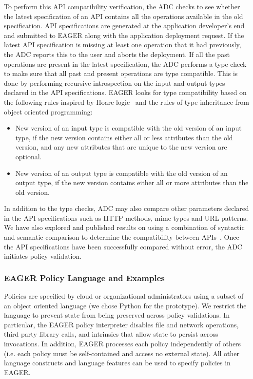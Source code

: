 To perform this API compatibility verification, the ADC checks to see whether
the latest specification of an API contains all the operations available in
the old specification. API specifications are generated at the application developer's
end and submitted to EAGER along with the application deployment request.
If the latest API specification is missing at least one
operation that it had previously, the ADC reports this to the user and aborts
the deployment. If all the past operations are present in the latest
specification, the ADC performs a type check to make sure that all past and
present operations are type compatible. This is done by performing recursive
introspection on the input and output types declared in the API
specifications. EAGER looks for type compatibility based on the following
rules inspired by Hoare logic~\cite{Hoare:1969:ABC:363235.363259} and the
rules of type inheritance from object oriented programming:
\begin{itemize}
\vspace{0.1in}
\item New version of an input type is compatible with the old version of an input type, if the new version contains either all or less attributes than the 
old version, and any new attributes that are unique to the new version are optional.
\vspace{0.1in}
\item New version of an output type is compatible with the old version of an output type, if the new version contains either all or more attributes than the 
old version.
\vspace{0.1in}
\end{itemize}
In addition to the type checks, ADC may also compare other parameters declared in the API specifications
such as HTTP methods, mime types and URL patterns. We have also explored and 
published results on using a combination of syntactic and semantic comparison
to determine the compatibility between APIs~\cite{6930607,jayathilaka2014using}.
Once the API specifications have been successfully compared without error,
the ADC initiates policy validation. 

\subsubsection{EAGER Policy Language and Examples}
\label{sec:policy-lang}
Policies are specified by cloud
or organizational administrators using a subset of an object oriented language
(we chose Python for the prototype).
We restrict the language to prevent state from being preserved across
policy validations. In particular, the EAGER policy interpreter disables 
file and network operations, third party library calls, 
and intrinsics that allow
state to persist across invocations.  
In addition, EAGER processes each 
policy independently of others (i.e. each policy must be self-contained and 
access no external state).  All other language constructs and 
language features can be used to specify policies in EAGER.

